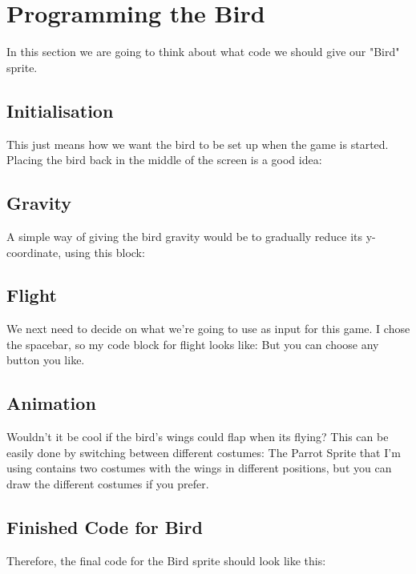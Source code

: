 \section{Programming the Bird}
In this section we are going to think about what code we should give our "Bird" sprite.

\subsection{Initialisation}
This just means how we want the bird to be set up when the game is started. Placing the bird back in the middle of the screen is a good idea:


\subsection{Gravity}
A simple way of giving the bird gravity would be to gradually reduce its y-coordinate, using this block:

\subsection{Flight}
We next need to decide on what we're going to use as input for this game. I chose the spacebar, so my code block for flight looks like:
But you can choose any button you like.

\subsection{Animation}
Wouldn't it be cool if the bird's wings could flap when its flying? 
This can be easily done by switching between different costumes:
The Parrot Sprite that I'm using contains two costumes with the wings in different positions, but you can draw the different costumes if you prefer.

\subsection{Finished Code for Bird}
Therefore, the final code for the Bird sprite should look like this:
